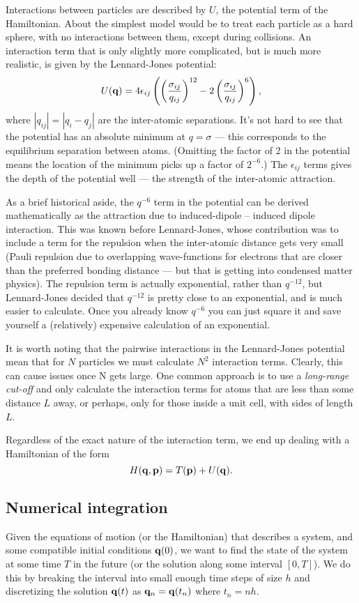 Interactions between particles are described by $U$, the potential term of the Hamiltonian. About the simplest model would be to treat each particle as a hard sphere, with no interactions between them, except during collisions.
An interaction term that is only slightly more complicated, but is much more realistic, is given by the Lennard-Jones potential:
$$
	U({\bf q}) = 4\epsilon_{ij}\left(\left(\frac{\sigma_{ij}}{q_{ij}}\right)^{12} - 2\left(\frac{\sigma_{ij}}{q_{ij}}\right)^{6}\right),
$$
where $|q_{ij}| = |q_i-q_j|$ are the inter-atomic separations. It's not hard to see that the potential has an absolute minimum at $q = \sigma$ --- this corresponds to the equilibrium separation between atoms. (Omitting the factor of 2 in the potential means the location of the minimum picks up a factor of $2^{-6}$.) The $\epsilon_{ij}$ terms gives the depth of the potential well --- the strength of the inter-atomic attraction. 

As a brief historical aside, the $q^{-6}$ term in the potential can be derived mathematically as the attraction due to induced-dipole -- induced dipole interaction. This was known before Lennard-Jones, whose contribution was to include a term for the repulsion when the inter-atomic distance gets very small (Pauli repulsion due to overlapping wave-functions for electrons that are closer than the preferred bonding distance --- but that is getting into condensed matter physics). The repulsion term is actually exponential, rather than $q^{-12}$, but Lennard-Jones decided that $q^{-12}$ is pretty close to an exponential, and is much easier to calculate. Once you already know $q^{-6}$ you can just square it and save yourself a (relatively) expensive calculation of an exponential.

It is worth noting that the pairwise interactions in the Lennard-Jones potential mean that for $N$ particles we must calculate $N^2$ interaction terms. Clearly, this can cause issues once N gets large. One common approach is to use a \emph{long-range cut-off} and only calculate the interaction terms for atoms that are less than some distance $L$ away, or perhaps, only for those inside a unit cell, with sides of length $L$.

Regardless of the exact nature of the interaction term, we end up dealing with a Hamiltonian of the form 
$$
	H({\bf q},{\bf p}) = T({\bf p}) + U({\bf q}).
$$

\subsection{Numerical integration}
Given the equations of motion (or the Hamiltonian) that describes a system, and some compatible initial conditions ${\bf q}(0)$, we want to find the state of the system at some time $T$ in the future (or the solution along some interval $[0,T]$). We do this by breaking the interval into small enough time steps of size $h$ and discretizing the solution ${\bf q}(t)$ as ${\bf q}_n = {\bf q}(t_n) $ where $t_n = nh$.


